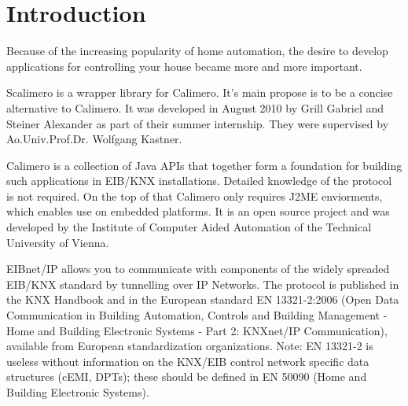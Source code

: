 \chapter{Introduction}

Because of the increasing popularity of home automation, the desire to develop applications for controlling your house became more and more important. 

Scalimero is a wrapper library for Calimero. It's main propose is to be a concise alternative to Calimero. It was developed in August 2010 by Grill Gabriel and Steiner Alexander as part of their summer internship. They were supervised by Ao.Univ.Prof.Dr. Wolfgang Kastner.

Calimero is a collection of Java APIs that together form a foundation for building such applications in EIB/KNX installations. Detailed knowledge of the protocol is not required. On the top of that Calimero only requires J2ME enviorments, which enables use on embedded platforms. It is an open source project and was developed by the Institute of Computer Aided Automation of the Technical University of Vienna.

EIBnet/IP allows you to communicate with components of the widely spreaded EIB/KNX standard by tunnelling over IP Networks. The protocol is published in the KNX Handbook  and in the European standard EN 13321-2:2006 (Open Data Communication in Building Automation, Controls and Building Management - Home and Building Electronic Systems - Part 2: KNXnet/IP Communication), available from European standardization organizations. Note: EN 13321-2 is useless without information on the KNX/EIB control network specific data structures (cEMI, DPTs); these should be defined in EN 50090 (Home and Building Electronic Systems).

